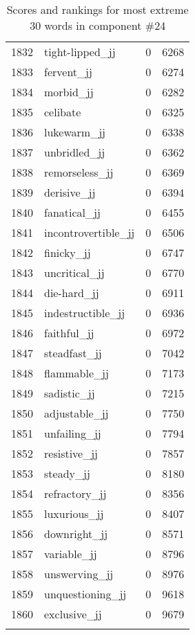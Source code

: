 \begin{longtable}[!htbp]{| rlr@{.}l |}
    1832 & tight-lipped\_jj & 0 & 6268 \\
    1833 & fervent\_jj & 0 & 6274 \\
    1834 & morbid\_jj & 0 & 6282 \\
    1835 & celibate & 0 & 6325 \\
    1836 & lukewarm\_jj & 0 & 6338 \\
    1837 & unbridled\_jj & 0 & 6362 \\
    1838 & remorseless\_jj & 0 & 6369 \\
    1839 & derisive\_jj & 0 & 6394 \\
    1840 & fanatical\_jj & 0 & 6455 \\
    1841 & incontrovertible\_jj & 0 & 6506 \\
    1842 & finicky\_jj & 0 & 6747 \\
    1843 & uncritical\_jj & 0 & 6770 \\
    1844 & die-hard\_jj & 0 & 6911 \\
    1845 & indestructible\_jj & 0 & 6936 \\
    1846 & faithful\_jj & 0 & 6972 \\
    1847 & steadfast\_jj & 0 & 7042 \\
    1848 & flammable\_jj & 0 & 7173 \\
    1849 & sadistic\_jj & 0 & 7215 \\
    1850 & adjustable\_jj & 0 & 7750 \\
    1851 & unfailing\_jj & 0 & 7794 \\
    1852 & resistive\_jj & 0 & 7857 \\
    1853 & steady\_jj & 0 & 8180 \\
    1854 & refractory\_jj & 0 & 8356 \\
    1855 & luxurious\_jj & 0 & 8407 \\
    1856 & downright\_jj & 0 & 8571 \\
    1857 & variable\_jj & 0 & 8796 \\
    1858 & unswerving\_jj & 0 & 8976 \\
    1859 & unquestioning\_jj & 0 & 9618 \\
    1860 & exclusive\_jj & 0 & 9679 \\
    \hline
    \caption{Scores and rankings for most extreme 30 words in component \#24} \\
\end{longtable}
